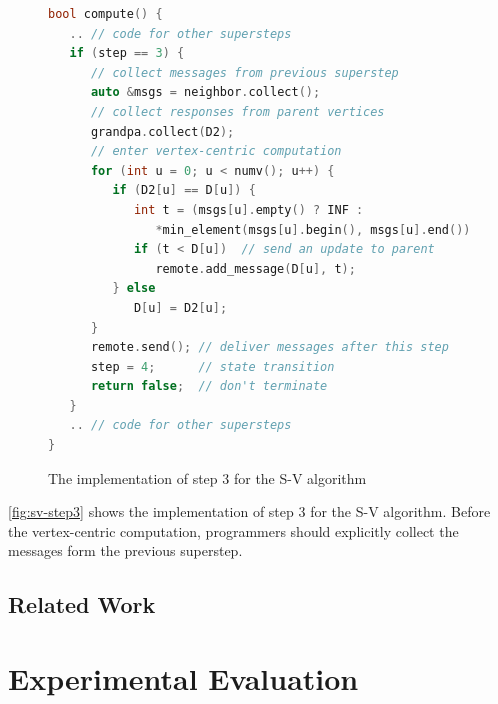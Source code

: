 \documentclass{sokendai_thesis} %
\begin{document}
\begin{figure}[ht]
\centering
\vspace{-2ex}
\begin{lstlisting}[basicstyle=\small\ttfamily,numbers=none,language=c++]
bool compute() {
   .. // code for other supersteps
   if (step == 3) {
      // collect messages from previous superstep
      auto &msgs = neighbor.collect();
      // collect responses from parent vertices
      grandpa.collect(D2);
      // enter vertex-centric computation
      for (int u = 0; u < numv(); u++) {
         if (D2[u] == D[u]) {
            int t = (msgs[u].empty() ? INF : 
               *min_element(msgs[u].begin(), msgs[u].end()));
            if (t < D[u])  // send an update to parent
               remote.add_message(D[u], t);
         } else
            D[u] = D2[u];
      }
      remote.send(); // deliver messages after this step
      step = 4;      // state transition
      return false;  // don't terminate
   }
   .. // code for other supersteps
}
\end{lstlisting}
\vspace{-2ex}
\caption{The implementation of step 3 for the S-V algorithm}
\label{fig:sv-step3}
\end{figure}

\autoref{fig:sv-step3} shows the implementation of step 3 for the S-V algorithm.
Before the vertex-centric computation, programmers should explicitly collect the messages form the previous superstep.

\section{Related Work}



\chapter{Experimental Evaluation}
\label{sec:evaluation}
\end{document}
